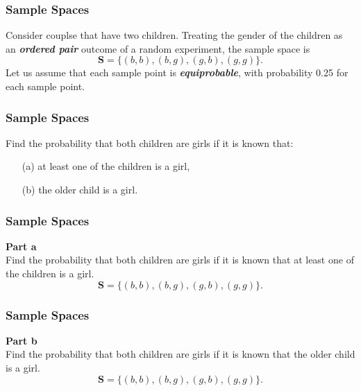 \documentclass{beamer}
\begin{document}
\begin{frame}
\frametitle{Sample Spaces}
\Large
Consider couplse that have two children. Treating the gender of the children as an \textit{\textbf{ordered pair}} outcome of a random experiment, the sample space is 
\[\boldsymbol{S} = \{ (b,b), (b,g), (g,b), (g,g)\}.\]
Let us assume that each sample point is \textit{\textbf{equiprobable}}, with probability 0.25 for each sample point.


\end{frame}

\begin{frame}
\frametitle{Sample Spaces}
\Large
\vspace{-1cm}
 Find the probability that both children are girls if it is known that: 

\begin{itemize}
\item[(a)] at least one of the children is a girl,
\item[(b)] the older child is a girl. 	
\end{itemize}	
\end{frame}


\begin{frame}
\frametitle{Sample Spaces}
\Large
\vspace{-1.5cm}
\textbf{Part a} \\
 Find the probability that both children are girls if it is known that at least one of the children is a girl.
\[\boldsymbol{S} = \{ (b,b), (b,g), (g,b), (g,g)\}.\]
	
\end{frame}

\begin{frame}
\frametitle{Sample Spaces}
\Large
\vspace{-1.5cm}
\textbf{Part b} \\
 Find the probability that both children are girls if it is known that the older child is a girl.
\[\boldsymbol{S} = \{ (b,b), (b,g), (g,b), (g,g)\}.\]
	
\end{frame}
\end{document}
